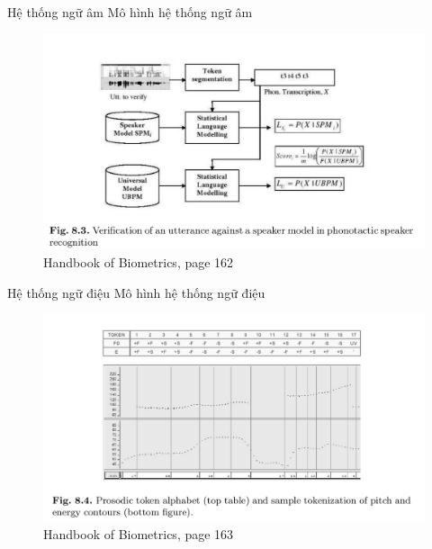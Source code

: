 \documentclass[notheorems, aspectratio=54]{beamer}
\begin{document}
\begin{frame}{Hệ thống ngữ âm}
	Mô hình hệ thống ngữ âm
	\begin{figure}[H]
		\includegraphics[width=0.9\linewidth]{images/figure_8_3.png}
		\caption{Handbook of Biometrics, page 162}
		\label{fig:writing-thesis}
	\end{figure}
\end{frame}	
\begin{frame}{Hệ thống ngữ điệu}
	Mô hình hệ thống ngữ điệu
	\begin{figure}
		\includegraphics[width=0.9\linewidth]{images/figure_8_4.png}
		\caption{Handbook of Biometrics, page 163}
		\label{fig:writing-thesis}
	\end{figure}
\end{frame}	
\end{document}
